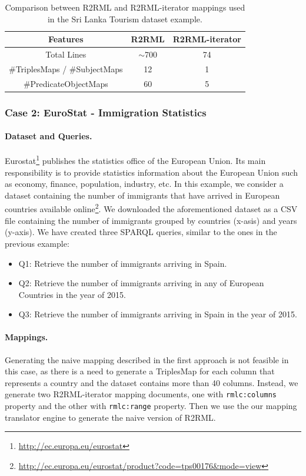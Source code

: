 \begin{table}[tbp]
\caption[R2RML vs R2RML-iterator in Sri Lanka dataset]{Comparison between R2RML and R2RML-iterator mappings used in the Sri Lanka Tourism dataset example.}
\label{table:compare1}
\begin{tabular}{c|c|c}
\hline
\textbf{Features} & \textbf{R2RML}   & \textbf{R2RML-iterator}  \\ \hline
Total Lines   & $\sim$700 & 74 \\ 
\#TriplesMaps / \#SubjectMaps     & 12                & 1           \\
\#PredicateObjectMaps  & 60              & 5            \\ \hline
\end{tabular}
\end{table}

\subsubsection{Case 2: EuroStat - Immigration Statistics}
\noindent\paragraph{Dataset and Queries.} Eurostat\footnote{\url{http://ec.europa.eu/eurostat}} publishes the statistics office of the European Union. Its main responsibility is to provide statistics information about the European Union such as economy, finance, population, industry, etc. In this example, we consider a dataset containing the number of immigrants that have arrived in European countries available online\footnote{\url{http://ec.europa.eu/eurostat/product?code=tps00176&mode=view}}. We downloaded the aforementioned dataset as a CSV file containing the number of immigrants grouped by countries (x-asis) and years (y-axis). We have created three SPARQL queries, similar to the ones in the previous example:

\begin{itemize}
\item Q1: Retrieve the number of immigrants arriving in Spain.
\item Q2: Retrieve the number of immigrants arriving in any of European Countries in the year of 2015.
\item Q3: Retrieve the number of immigrants arriving in Spain in the year of 2015.
\end{itemize}

\noindent\paragraph{Mappings.}
Generating the naive mapping described in the first approach is not feasible in this case, as there is a need to generate a TriplesMap for each column that represents a country and the dataset contains more than 40 columns. Instead, we generate two R2RML-iterator mapping documents, one with \texttt{rmlc:columns} property and the other with \texttt{rmlc:range} property. Then we use the our mapping translator engine to generate the naive version of R2RML.

